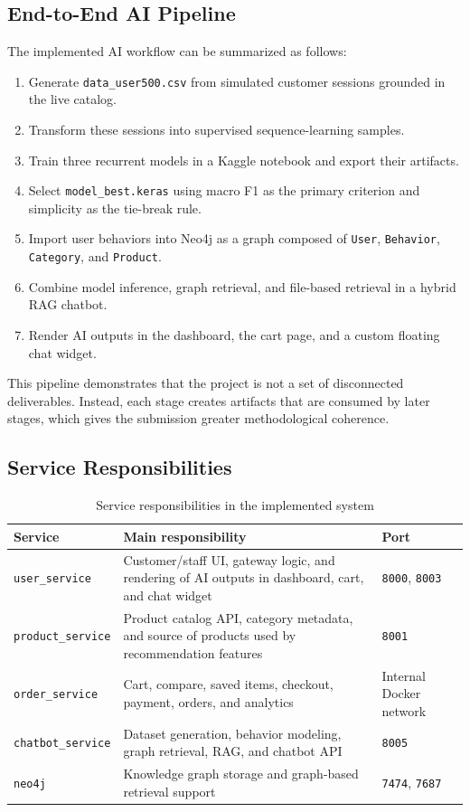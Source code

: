 \documentclass[12pt,a4paper]{article}
\begin{document}
\subsection{End-to-End AI Pipeline}
The implemented AI workflow can be summarized as follows:
\begin{enumerate}[label=\arabic*.]
  \item Generate \texttt{data\_user500.csv} from simulated customer sessions grounded in the live catalog.
  \item Transform these sessions into supervised sequence-learning samples.
  \item Train three recurrent models in a Kaggle notebook and export their artifacts.
  \item Select \texttt{model\_best.keras} using macro F1 as the primary criterion and simplicity as the tie-break rule.
  \item Import user behaviors into Neo4j as a graph composed of \texttt{User}, \texttt{Behavior}, \texttt{Category}, and \texttt{Product}.
  \item Combine model inference, graph retrieval, and file-based retrieval in a hybrid RAG chatbot.
  \item Render AI outputs in the dashboard, the cart page, and a custom floating chat widget.
\end{enumerate}

This pipeline demonstrates that the project is not a set of disconnected deliverables. Instead, each stage creates artifacts that are consumed by later stages, which gives the submission greater methodological coherence.

\subsection{Service Responsibilities}
\begin{table}[H]
\centering
\caption{Service responsibilities in the implemented system}
\begin{tabularx}{\linewidth}{>{\raggedright\arraybackslash}p{3cm} >{\raggedright\arraybackslash}X >{\raggedright\arraybackslash}p{2.3cm}}
\toprule
Service & Main responsibility & Port \\
\midrule
\texttt{user\_service} & Customer/staff UI, gateway logic, and rendering of AI outputs in dashboard, cart, and chat widget & \texttt{8000}, \texttt{8003} \\
\texttt{product\_service} & Product catalog API, category metadata, and source of products used by recommendation features & \texttt{8001} \\
\texttt{order\_service} & Cart, compare, saved items, checkout, payment, orders, and analytics & Internal Docker network \\
\texttt{chatbot\_service} & Dataset generation, behavior modeling, graph retrieval, RAG, and chatbot API & \texttt{8005} \\
\texttt{neo4j} & Knowledge graph storage and graph-based retrieval support & \texttt{7474}, \texttt{7687} \\
\bottomrule
\end{tabularx}
\end{table}
\end{document}
